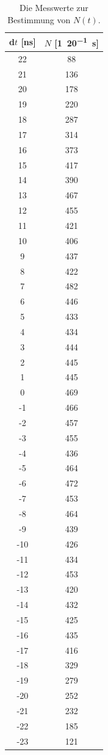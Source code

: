 \documentclass[
  bibliography=totoc,     %
  captions=tableheading,  %
  titlepage=firstiscover, %
]{scrartcl}
\begin{document}
\begin{table}[H]
\centering
\caption{Die Messwerte zur Bestimmung von $N(t)$.}
  \label{tab:1}
\begin{tabular}{c c}
    \toprule
    d$t$  [\si{\nano\second}] & $N$  [\si{1\per20\second}] \\
    \midrule
    22  & 88 \\
    21  & 136 \\
    20  & 178 \\
    19  & 220 \\
    18  & 287 \\
    17  & 314 \\
    16  & 373 \\
    15  & 417 \\
    14  & 390 \\
    13  & 467 \\
    12  & 455 \\
    11  & 421 \\
    10  & 406 \\
    9   & 437 \\
    8   & 422 \\
    7   & 482 \\
    6   & 446 \\
    5   & 433 \\
    4   & 434 \\
    3   & 444 \\
    2   & 445 \\
    1   & 445 \\
    0   & 469 \\
    -1  & 466 \\
    -2  & 457 \\
    -3  & 455 \\
    -4  & 436 \\
    -5  & 464 \\
    -6  & 472 \\
    -7  & 453 \\
    -8  & 464 \\
    -9  & 439 \\
    -10 & 426 \\
    -11 & 434 \\
    -12 & 453 \\
    -13 & 420 \\
    -14 & 432 \\
    -15 & 425 \\
    -16 & 435 \\
    -17 & 416 \\
    -18 & 329 \\
    -19 & 279 \\
    -20 & 252 \\
    -21 & 232 \\
    -22 & 185 \\
    -23 & 121 \\
    \bottomrule
  \end{tabular}
\end{table}
\end{document}
